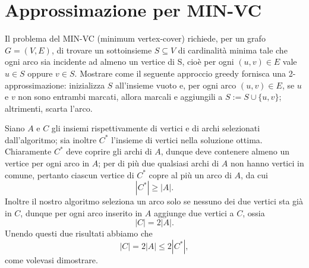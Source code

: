 \chapter{Approssimazione per MIN-VC}

\begin{problem*}
    Il problema del MIN-VC (minimum vertex-cover) richiede,
    per un grafo $G = (V, E)$, di trovare un sottoinsieme $S \subseteq V$ di cardinalità
    minima tale che ogni arco sia incidente ad almeno un vertice di S, cioè
    per ogni $(u, v)\in  E$ vale $u \in S$ oppure $v \in S$. Mostrare come il seguente approccio 
    greedy fornisca una 2-approssimazione: inizializza $S$ all’insieme vuoto e, per ogni arco 
    $(u, v) \in E$, se $u$ e $v$ non sono entrambi marcati, allora marcali e aggiungili a 
    $S := S \cup \{u, v\}$; altrimenti, scarta l’arco.
\end {problem*}

Siano $A$ e $C$ gli insiemi rispettivamente di vertici e di archi selezionati dall'algoritmo; sia inoltre $C^*$ l'insieme di vertici nella soluzione ottima.\newline
Chiaramente $C^*$ deve coprire gli archi di $A$, dunque deve contenere almeno un vertice per ogni arco in $A$; per di più due qualsiasi archi di $A$ non hanno vertici in comune, pertanto ciascun vertice di $C^*$ copre al più un arco di $A$, da cui \[|C^*|\ge|A|.\]
Inoltre il nostro algoritmo seleziona un arco solo se nessuno dei due vertici sta già in $C$, dunque per ogni arco inserito in $A$ aggiunge due vertici a $C$, ossia \[|C|=2|A|.\]
Unendo questi due risultati abbiamo che \[|C| = 2|A| \le 2|C^*|,\] come volevasi dimostrare.
